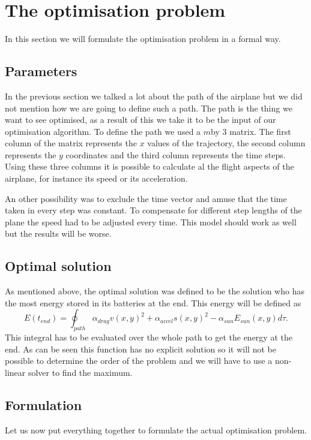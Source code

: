 \section{The optimisation problem}


In this section we will formulate the optimisation problem in a formal way.


\subsection{Parameters}

In the previous section we talked a lot about the path of the airplane but we did not mention how we are going to define such a path.
The path is the thing we want to see optimised, as a result of this we take it to be the input of our optimisation algorithm.
To define the path we used a $ m $by 3 matrix.
The first column of the matrix represents the $ x $ values of the trajectory, the second column represents the $ y $ coordinates and the third column represents the time steps.
Using these three columns it is possible to calculate al the flight aspects of the airplane, for instance its speed or its acceleration.

An other possibility was to exclude the time vector and amuse that the time taken in every step was constant.
To compensate for different step lengths of the plane the speed had to be adjusted every time.
This model should work as well but the results will be worse.

\subsection{Optimal solution}

As mentioned above, the optimal solution was defined to be the solution who has the most energy stored in its batteries at the end.
This energy will be defined as
\begin{equation}
E(t_{end}) = \oint_{path} \alpha_{drag}v(x,y)^2  + \alpha_{accel}  s(x,y)^2   -\alpha_{sun} E_{sun}(x,y)  d\tau.
\end{equation}
This integral has to be evaluated over the whole path to get the energy at the end.
As  can be seen this function has no explicit solution so it will not be possible to determine the order of the problem and we will have to use a non-linear solver to find the maximum.

\subsection{Formulation}

Let us now put everything together to formulate the actual optimisation problem.

